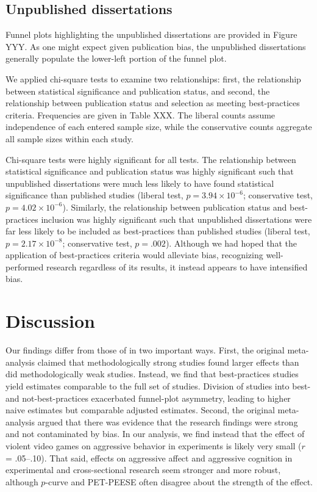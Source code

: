 \documentclass[man]{apa6}
\begin{document}
\subsection{Unpublished dissertations}
Funnel plots highlighting the unpublished dissertations are provided in Figure YYY. As one might expect given publication bias, the unpublished dissertations generally populate the lower-left portion of the funnel plot. 

We applied chi-square tests to examine two relationships: first, the relationship between statistical significance and publication status, and second, the relationship between publication status and selection as meeting best-practices criteria. Frequencies are given in Table XXX. The liberal counts assume independence of each entered sample size, while the conservative counts aggregate all sample sizes within each study.

Chi-square tests were highly significant for all tests. The relationship between statistical significance and publication status was highly significant such that unpublished dissertations were much less likely to have found statistical significance than published studies (liberal test, $p = 3.94 \times 10^{-6}$; conservative test, $p = 4.02 \times 10^{-6}$). Similarly, the relationship between publication status and best-practices inclusion was highly significant such that unpublished dissertations were far less likely to be included as best-practices than published studies (liberal test, $p = 2.17 \times 10^{-8}$; conservative test, $p = .002$). Although we had hoped that the application of best-practices criteria would alleviate bias, recognizing well-performed research regardless of its results, it instead appears to have intensified bias. 

\section{Discussion}
Our findings differ from those of \citet{Anderson:etal:2010} in two important ways. First, the original meta-analysis claimed that methodologically strong studies found larger effects than did methodologically weak studies. Instead, we find that best-practices studies yield estimates comparable to the full set of studies. Division of studies into best- and not-best-practices exacerbated funnel-plot asymmetry, leading to higher naive estimates but comparable adjusted estimates. Second, the original meta-analysis argued that there was evidence that the research findings were strong and not contaminated by bias. In our analysis, we find instead that the effect of violent video games on aggressive behavior in experiments is likely very small ($r$ = .05--.10). That said, effects on aggressive affect and aggressive cognition in experimental and cross-sectional research seem stronger and more robust, although $p$-curve and PET-PEESE often disagree about the strength of the effect.
\end{document}
